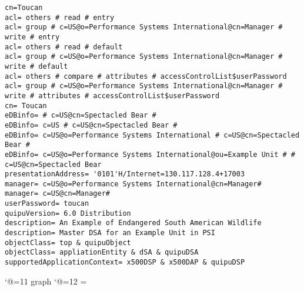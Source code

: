 
\tiny
\begin{verbatim}
cn=Toucan
acl= others # read # entry
acl= group # c=US@o=Performance Systems International@cn=Manager # write # entry
acl= others # read # default
acl= group # c=US@o=Performance Systems International@cn=Manager # write # default
acl= others # compare # attributes # accessControlList$userPassword
acl= group # c=US@o=Performance Systems International@cn=Manager # write # attributes # accessControlList$userPassword
cn= Toucan
eDBinfo= # c=US@cn=Spectacled Bear # 
eDBinfo= c=US # c=US@cn=Spectacled Bear # 
eDBinfo= c=US@o=Performance Systems International # c=US@cn=Spectacled Bear # 
eDBinfo= c=US@o=Performance Systems International@ou=Example Unit # # c=US@cn=Spectacled Bear
presentationAddress= '0101'H/Internet=130.117.128.4+17003
manager= c=US@o=Performance Systems International@cn=Manager#
manager= c=US@cn=Manager#
userPassword= toucan
quipuVersion= 6.0 Distribution
description= An Example of Endangered South American Wildlife
description= Master DSA for an Example Unit in PSI
objectClass= top & quipuObject
objectClass= appliationEntity & dSA & quipuDSA
supportedApplicationContext= x500DSP & x500DAP & quipuDSP

\end{verbatim}

\catcode`@=11
\expandafter\ifx\csname graph\endcsname\relax {}\box\chardef\insc@unt\graph\fi
\catcode`@=12
\setbox\graph=\empty
